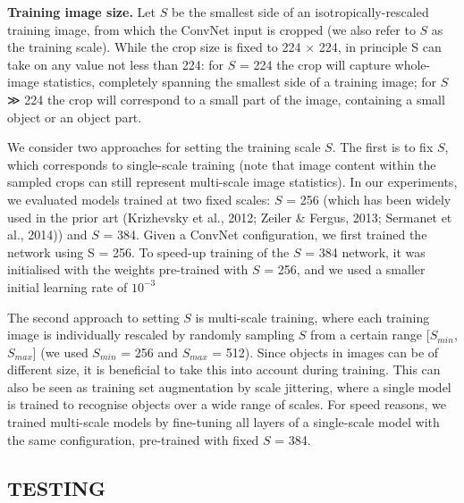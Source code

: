 \documentclass[12pt,a4paper,UTF8,twoside]{book}
\begin{document}
\textbf{Training image size.} Let \(S\) be the smallest side of an isotropically-rescaled training image, from which the ConvNet input is cropped (we also refer to \(S\) as the training scale). While the crop size is fixed to 224 × 224, in principle S can take on any value not less than 224: for \(S\) = 224 the crop will capture whole-image statistics, completely spanning the smallest side of a training image; for \(S\) ≫ 224 the crop will correspond to a small part of the image, containing a small object or an object part.

We consider two approaches for setting the training scale \(S\). The first is to fix \(S\), which corresponds to single-scale training (note that image content within the sampled crops can still represent multi-scale image statistics). In our experiments, we evaluated models trained at two fixed scales: \(S\) = 256 (which has been widely used in the prior art (Krizhevsky et al., 2012; Zeiler \& Fergus, 2013; Sermanet et al., 2014)) and \(S\) = 384. Given a ConvNet configuration, we first trained the network using S = 256. To speed-up training of the \(S\) = 384 network, it was initialised with the weights pre-trained with \(S\) = 256, and we used a smaller initial learning rate of \(10^{-3}\)

The second approach to setting \(S\) is multi-scale training, where each training image is individually rescaled by randomly sampling \(S\) from a certain range {[}\(S_{min}\), \(S_{max}\){]} (we used \(S_{min}\) = 256 and \(S_{max}\) = 512). Since objects in images can be of different size, it is beneficial to take this into account during training. This can also be seen as training set augmentation by scale jittering, where a single model is trained to recognise objects over a wide range of scales. For speed reasons, we trained multi-scale models by fine-tuning all layers of a single-scale model with the same configuration, pre-trained with fixed \(S\) = 384.

\hypertarget{testing}{%
\subsection{TESTING}\label{testing}}
\end{document}
